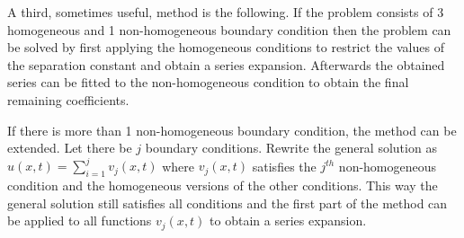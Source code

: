 	\begin{method}
		A third, sometimes useful, method is the following. If the problem consists of 3 homogeneous and 1 non-homogeneous boundary condition then the problem can be solved by first applying the homogeneous conditions to restrict the values of the separation constant and obtain a series expansion. Afterwards the obtained series can be fitted to the non-homogeneous condition to obtain the final remaining coefficients.

	        If there is more than 1 non-homogeneous boundary condition, the method can be extended. Let there be $j$ boundary conditions. Rewrite the general solution as $u(x, t) = \sum_{i=1}^jv_j(x, t)$ where $v_j(x, t)$ satisfies the $j^{th}$ non-homogeneous condition and the homogeneous versions of the other conditions. This way the general solution still satisfies all conditions and the first part of the method can be applied to all functions $v_j(x, t)$ to obtain a series expansion.
	\end{method}

